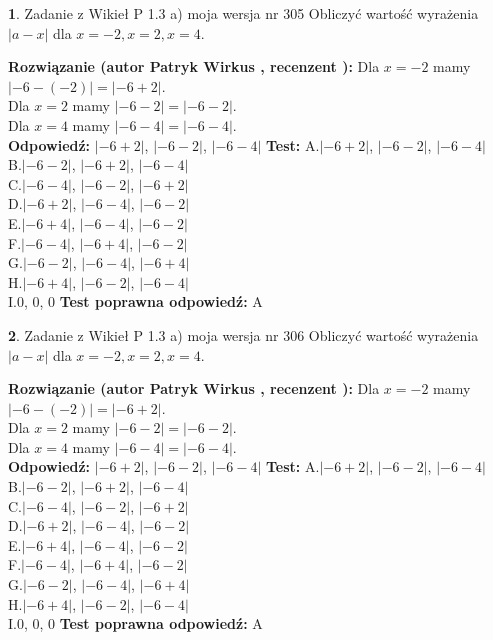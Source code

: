 \documentclass[12pt, a4paper]{article}
\theoremstyle{definition} %
\newtheorem{zad}{}
\newcommand{\zadStart}[1]{\begin{zad}#1\newline}
\newcommand{\zadStop}{\end{zad}}
\newcommand{\rozwStart}[2]{\noindent \textbf{Rozwiązanie (autor #1 , recenzent #2): }\newline}
\newcommand{\rozwStop}{\newline}
\newcommand{\odpStart}{\noindent \textbf{Odpowiedź:}\newline}
\newcommand{\odpStop}{\newline}
\newcommand{\testStart}{\noindent \textbf{Test:}\newline}
\newcommand{\testStop}{\newline}
\newcommand{\kluczStart}{\noindent \textbf{Test poprawna odpowiedź:}\newline}
\newcommand{\kluczStop}{\newline}
\begin{document}
\zadStart{Zadanie z Wikieł P 1.3 a) moja wersja nr 305}
Obliczyć wartość wyrażenia $|a - x|$ dla $x=-2,x=2,x=4$.
\zadStop
\rozwStart{Patryk Wirkus}{}
Dla $x = -2$ mamy $|-6 - (-2)| = |-6 + 2|$.\\
Dla $x = 2$ mamy $|-6 - 2| = |-6 - 2|$.\\
Dla $x = 4$ mamy $|-6 - 4| = |-6 - 4|$.\\
\rozwStop
\odpStart
$|-6 + 2|$, $|-6 - 2|$, $|-6 - 4|$
\odpStop
\testStart
A.$|-6 + 2|$, $|-6 - 2|$, $|-6 - 4|$\\
B.$|-6 - 2|$, $|-6 + 2|$, $|-6 - 4|$\\
C.$|-6 - 4|$, $|-6 - 2|$, $|-6 + 2|$\\
D.$|-6 + 2|$, $|-6 - 4|$, $|-6 - 2|$\\
E.$|-6 + 4|$, $|-6 - 4|$, $|-6 - 2|$\\
F.$|-6 - 4|$, $|-6 + 4|$, $|-6 - 2|$\\
G.$|-6 - 2|$, $|-6 - 4|$, $|-6 + 4|$\\
H.$|-6 + 4|$, $|-6 - 2|$, $|-6 - 4|$\\
I.$0$, $0$, $0$
\testStop
\kluczStart
A
\kluczStop



\zadStart{Zadanie z Wikieł P 1.3 a) moja wersja nr 306}
Obliczyć wartość wyrażenia $|a - x|$ dla $x=-2,x=2,x=4$.
\zadStop
\rozwStart{Patryk Wirkus}{}
Dla $x = -2$ mamy $|-6 - (-2)| = |-6 + 2|$.\\
Dla $x = 2$ mamy $|-6 - 2| = |-6 - 2|$.\\
Dla $x = 4$ mamy $|-6 - 4| = |-6 - 4|$.\\
\rozwStop
\odpStart
$|-6 + 2|$, $|-6 - 2|$, $|-6 - 4|$
\odpStop
\testStart
A.$|-6 + 2|$, $|-6 - 2|$, $|-6 - 4|$\\
B.$|-6 - 2|$, $|-6 + 2|$, $|-6 - 4|$\\
C.$|-6 - 4|$, $|-6 - 2|$, $|-6 + 2|$\\
D.$|-6 + 2|$, $|-6 - 4|$, $|-6 - 2|$\\
E.$|-6 + 4|$, $|-6 - 4|$, $|-6 - 2|$\\
F.$|-6 - 4|$, $|-6 + 4|$, $|-6 - 2|$\\
G.$|-6 - 2|$, $|-6 - 4|$, $|-6 + 4|$\\
H.$|-6 + 4|$, $|-6 - 2|$, $|-6 - 4|$\\
I.$0$, $0$, $0$
\testStop
\kluczStart
A
\kluczStop
\end{document}
